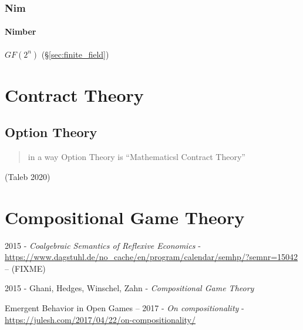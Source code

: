 \subsubsection{Nim}\label{sec:nim}

\paragraph{Nimber}\label{sec:nimber}\hfill

$GF(2^n)$ (\S\ref{sec:finite_field})



\section{Contract Theory}\label{sec:contract_theory}

\subsection{Option Theory}\label{sec:option_theory}

\begin{quote}
  in a way Option Theory is ``Mathematicsl Contract Theory''
\end{quote}
(Taleb 2020)



\section{Compositional Game Theory}\label{sec:compositional_game_theory}

2015 - \emph{Coalgebraic Semantics of Reflexive Economics} -
\url{https://www.dagstuhl.de/no_cache/en/program/calendar/semhp/?semnr=15042} --
(FIXME)

2015 - Ghani, Hedges, Winschel, Zahn - \emph{Compositional Game Theory}

Emergent Behavior in Open Games --
2017 - \emph{On compositionality} -
\url{https://julesh.com/2017/04/22/on-compositionality/}

